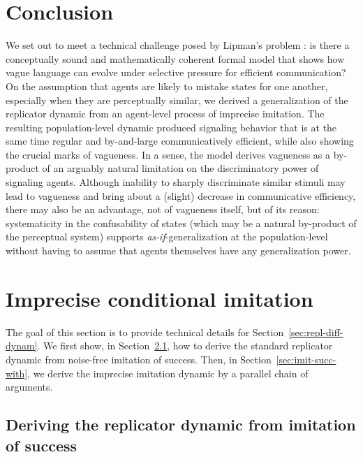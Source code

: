 \documentclass[fleqn,reqno,10pt]{article}
\begin{document}

\section{Conclusion}
\label{sec:conclusion}

We set out to meet a technical challenge posed by Lipman's problem
\citep{Lipman2009:Why-is-Language}: is there a conceptually sound and mathematically coherent
formal model that shows how vague language can evolve under selective pressure for efficient
communication? On the assumption that agents are likely to mistake states for one another,
especially when they are perceptually similar, we derived a generalization of the replicator
dynamic from an agent-level process of imprecise imitation. The resulting population-level
dynamic produced signaling behavior that is at the same time regular and by-and-large
communicatively efficient, while also showing the crucial marks of vagueness. In a sense, the
model derives vagueness as a by-product of an arguably natural limitation on the discriminatory
power of signaling agents.  Although inability to sharply discriminate similar stimuli may lead
to vagueness and bring about a (slight) decrease in communicative efficiency, there may also be
an advantage, not of vagueness itself, but of its reason: systematicity in the confusability of
states (which may be a natural by-product of the perceptual system) supports
\emph{as-if}-generalization at the population-level without having to assume that agents
themselves have any generalization power.



\appendix

\section{Imprecise conditional imitation}
\label{sec:formal-stuff}

The goal of this section is to provide technical details for
Section~\ref{sec:repl-diff-dynam}. We first show, in Section~\ref{sec:cond-imit-succ}, how to
derive the standard replicator dynamic from noise-free imitation of success. Then, in
Section~\ref{sec:imit-succ-with}, we derive the imprecise imitation dynamic by a parallel
chain of arguments.


\subsection{Deriving the replicator dynamic from imitation of success}
\label{sec:cond-imit-succ}
\end{document}
